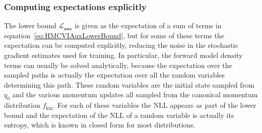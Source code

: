 \subsubsection{Computing expectations explicitly}

The lower bound $\mathcal{L_\textrm{aux}}$ is given as the expectation of a sum of terms in equation~\eqref{eq:HMCVIAuxLowerBound}, but for some of these terms the expectation can be computed explicitly, reducing the noise in the stochastic gradient estimates used for training. In particular, the forward model density terms can usually be solved analytically, because the expectation over the sampled paths is actually the expectation over all the random variables determining this path. These random variables are the initial state sampled from $q_0$ and the various momentum updates all sampled from the canonical momentum distribution $f_\textrm{kin}$. For each of these variables the NLL appears as part of the lower bound and the expectation of the NLL of a random variable is actually its entropy, which is known in closed form for most distributions.
